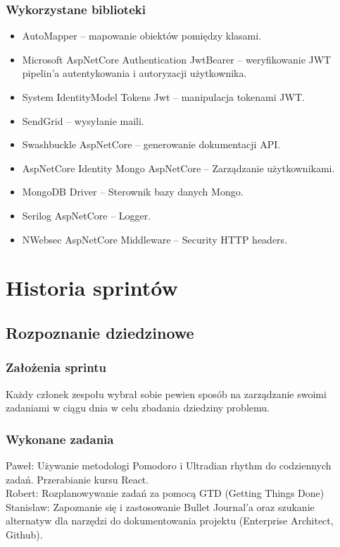 \documentclass[a4paper,11pt]{report}
\begin{document}
\subsection{Wykorzystane biblioteki}
\begin{itemize}
	\item AutoMapper – mapowanie obiektów pomiędzy klasami.
	\item Microsoft AspNetCore Authentication JwtBearer – weryfikowanie JWT pipelin'a autentykowania i autoryzacji użytkownika.
	\item System IdentityModel Tokens Jwt – manipulacja tokenami JWT.
	\item SendGrid – wysyłanie maili.
	\item Swashbuckle AspNetCore – generowanie dokumentacji API.
	\item AspNetCore Identity Mongo AspNetCore – Zarządzanie użytkownikami.
	\item MongoDB Driver – Sterownik bazy danych Mongo.
	\item Serilog AspNetCore – Logger.
	\item NWebsec AspNetCore Middleware – Security HTTP headers.
\end{itemize}

\chapter {Historia sprintów}
\section {Rozpoznanie dziedzinowe}
\subsection {Założenia sprintu}
Każdy członek zespołu wybrał sobie pewien sposób na zarządzanie swoimi zadaniami w ciągu dnia w celu zbadania dziedziny problemu.
\subsection {Wykonane zadania}
Paweł: Używanie metodologi Pomodoro i Ultradian rhythm do codziennych zadań. Przerabianie kursu React.\\
Robert: Rozplanowywanie zadań za pomocą GTD (Getting Things Done)\\
Stanisław: Zapoznanie się i zastosowanie Bullet Journal'a oraz szukanie alternatyw dla narzędzi do dokumentowania projektu (Enterprise Architect, Github).\\
\end{document}
